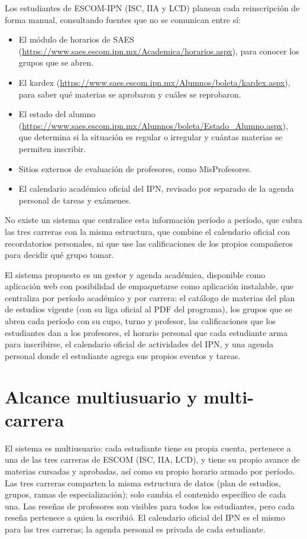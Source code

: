 \documentclass[11pt,letterpaper]{article}
\begin{document}
Los estudiantes de ESCOM-IPN (ISC, IIA y LCD) planean cada reinscripción de forma manual, consultando fuentes que no se comunican entre sí:

\begin{itemize}[nosep]
  \item El módulo de horarios de SAES (\url{https://www.saes.escom.ipn.mx/Academica/horarios.aspx}), para conocer los grupos que se abren.
  \item El kardex (\url{https://www.saes.escom.ipn.mx/Alumnos/boleta/kardex.aspx}), para saber qué materias se aprobaron y cuáles se reprobaron.
  \item El estado del alumno (\url{https://www.saes.escom.ipn.mx/Alumnos/boleta/Estado_Alumno.aspx}), que determina si la situación es regular o irregular y cuántas materias se permiten inscribir.
  \item Sitios externos de evaluación de profesores, como MisProfesores.
  \item El calendario académico oficial del IPN, revisado por separado de la agenda personal de tareas y exámenes.
\end{itemize}

No existe un sistema que centralice esta información período a período, que cubra las tres carreras con la misma estructura, que combine el calendario oficial con recordatorios personales, ni que use las calificaciones de los propios compañeros para decidir qué grupo tomar.

El sistema propuesto es un gestor y agenda académica, disponible como aplicación web con posibilidad de empaquetarse como aplicación instalable, que centraliza por período académico y por carrera: el catálogo de materias del plan de estudios vigente (con su liga oficial al PDF del programa), los grupos que se abren cada período con su cupo, turno y profesor, las calificaciones que los estudiantes dan a los profesores, el horario personal que cada estudiante arma para inscribirse, el calendario oficial de actividades del IPN, y una agenda personal donde el estudiante agrega sus propios eventos y tareas.

\section{Alcance multiusuario y multi-carrera}

El sistema es multiusuario: cada estudiante tiene su propia cuenta, pertenece a una de las tres carreras de ESCOM (ISC, IIA, LCD), y tiene su propio avance de materias cursadas y aprobadas, así como su propio horario armado por período. Las tres carreras comparten la misma estructura de datos (plan de estudios, grupos, ramas de especialización); solo cambia el contenido específico de cada una. Las reseñas de profesores son visibles para todos los estudiantes, pero cada reseña pertenece a quien la escribió. El calendario oficial del IPN es el mismo para las tres carreras; la agenda personal es privada de cada estudiante.
\end{document}
